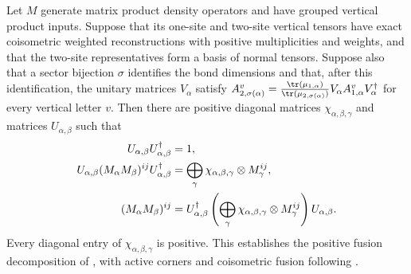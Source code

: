 \begin{lemma}
    \label{thm:mpdo_grouped_vertical_product_positive_fusion_decomposition}
    \leanok
    Let $M$ generate matrix product density operators and have grouped
    vertical product inputs. Suppose that its one-site and two-site vertical
    tensors have exact coisometric weighted reconstructions with positive
    multiplicities and weights, and that the two-site representatives form a
    basis of normal tensors. Suppose also that a sector bijection $\sigma$
    identifies the bond dimensions and that, after this identification, the
    unitary matrices $V_\alpha$ satisfy
    $A_{2,\sigma(\alpha)}^v=
        \frac{\tr(\mu_{1,\alpha})}{\tr(\mu_{2,\sigma(\alpha)})}
        V_\alpha A_{1,\alpha}^vV_\alpha^\dagger$ for every vertical letter
    $v$. Then there are positive diagonal matrices
    $\chi_{\alpha,\beta,\gamma}$ and matrices $U_{\alpha,\beta}$ such that
    \begin{align}
        U_{\alpha,\beta}U_{\alpha,\beta}^{\dagger}
         & =1,
        \notag                         \\
        U_{\alpha,\beta}(M_\alpha M_\beta)^{ij}
        U_{\alpha,\beta}^{\dagger}
         & =\bigoplus_\gamma
        \chi_{\alpha,\beta,\gamma}\otimes M_\gamma^{ij},
        \notag                         \\
        (M_\alpha M_\beta)^{ij}
         & =U_{\alpha,\beta}^{\dagger}
        \left(\bigoplus_\gamma
        \chi_{\alpha,\beta,\gamma}\otimes M_\gamma^{ij}\right)
        U_{\alpha,\beta}.
        \notag
    \end{align}
    Every diagonal entry of $\chi_{\alpha,\beta,\gamma}$ is positive.
    This establishes the positive fusion decomposition of
    \cite[Appendix~C.4, lines~2020--2029]{Cirac2016MPDO_arXiv}, with active
    corners and coisometric fusion following
    \cite{gap:cpsv16_bnt_uniqueness_zero_coefficient,
        gap:cpsv16_figure11_per_pair_support, gap:cpsv16_figure11_fusion_coisometry}.
\end{lemma}


